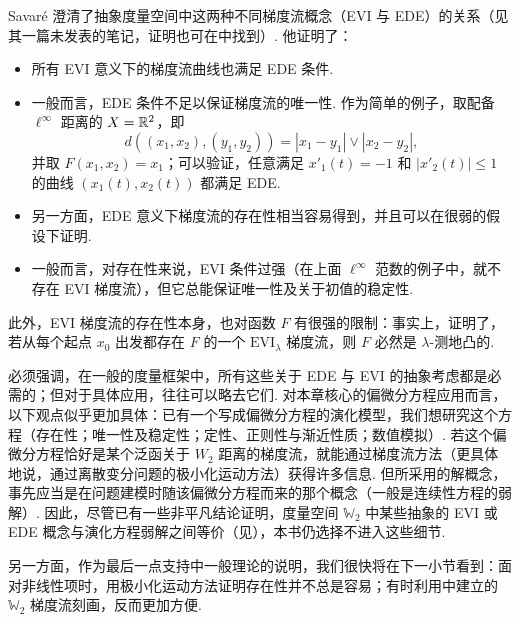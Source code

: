 Savar\'e 澄清了抽象度量空间中这两种不同梯度流概念（EVI 与 EDE）的关系（见其一篇未发表的笔记，证明也可在\cite{b9}中找到）. 他证明了：
\begin{itemize}
\item 所有 EVI 意义下的梯度流曲线也满足 EDE 条件.
\item 一般而言，EDE 条件不足以保证梯度流的唯一性. 作为简单的例子，取配备 $\ell^\infty$ 距离的 $X=\mathbb R^2$，即
\[
d((x_1,x_2),(y_1,y_2))=|x_1-y_1|\vee|x_2-y_2|,
\]
并取 $F(x_1,x_2)=x_1$；可以验证，任意满足 $x'_1(t)=-1$ 和 $|x'_2(t)|\leq1$ 的曲线 $(x_1(t),x_2(t))$ 都满足 EDE.
\item 另一方面，EDE 意义下梯度流的存在性相当容易得到，并且可以在很弱的假设下证明.
\item 一般而言，对存在性来说，EVI 条件过强（在上面 $\ell^\infty$ 范数的例子中，就不存在 EVI 梯度流），但它总能保证唯一性及关于初值的稳定性.
\end{itemize}
此外，EVI 梯度流的存在性本身，也对函数 $F$ 有很强的限制：事实上，\cite{b134}证明了，若从每个起点 $x_0$ 出发都存在 $F$ 的一个 $\mathrm{EVI}_\lambda$ 梯度流，则 $F$ 必然是 $\lambda$-测地凸的.

必须强调，在一般的度量框架中，所有这些关于 EDE 与 EVI 的抽象考虑都是必需的；但对于具体应用，往往可以略去它们. 对本章核心的偏微分方程应用而言，以下观点似乎更加具体：已有一个写成偏微分方程的演化模型，我们想研究这个方程（存在性；唯一性及稳定性；定性、正则性与渐近性质；数值模拟）. 若这个偏微分方程恰好是某个泛函关于 $W_2$ 距离的梯度流，就能通过梯度流方法（更具体地说，通过离散变分问题的极小化运动方法）获得许多信息. 但所采用的解概念，事先应当是在问题建模时随该偏微分方程而来的那个概念（一般是连续性方程的弱解）. 因此，尽管已有一些非平凡结论证明，度量空间 $\mathbb W_2$ 中某些抽象的 EVI 或 EDE 概念与演化方程弱解之间等价（见\cite{b15}），本书仍选择不进入这些细节.

另一方面，作为最后一点支持\cite{b15}中一般理论的说明，我们很快将在下一小节看到：面对非线性项时，用极小化运动方法证明存在性并不总是容易；有时利用\cite{b15}中建立的 $\mathbb W_2$ 梯度流刻画，反而更加方便.
